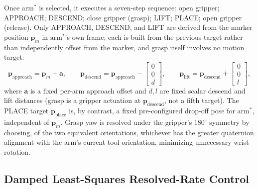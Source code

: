 Once $\text{arm}^*$ is selected, it executes a seven-step sequence: open gripper; APPROACH;
DESCEND; close gripper (grasp); LIFT; PLACE; open gripper (release). Only APPROACH, DESCEND, and
LIFT are derived from the marker position $\mathbf{p}_m$ in $\text{arm}^*$'s own frame; each is
built from the previous target rather than independently offset from the marker, and grasp itself
involves no motion target:
\begin{equation}
\mathbf{p}_{\text{approach}} = \mathbf{p}_m + \mathbf{a}, \qquad
\mathbf{p}_{\text{descend}} = \mathbf{p}_{\text{approach}} - \begin{bmatrix} 0 \\ 0 \\ d \end{bmatrix}, \qquad
\mathbf{p}_{\text{lift}} = \mathbf{p}_{\text{descend}} + \begin{bmatrix} 0 \\ 0 \\ l \end{bmatrix},
\label{eq:sv_waypoints}
\end{equation}
where $\mathbf{a}$ is a fixed per-arm approach offset and $d, l$ are fixed scalar descend and lift
distances (grasp is a gripper actuation at $\mathbf{p}_{\text{descend}}$, not a fifth target). The
PLACE target $\mathbf{p}_{\text{place}}$ is, by contrast, a fixed pre-configured drop-off pose for
$\text{arm}^*$, independent of $\mathbf{p}_m$. Grasp yaw is resolved under the gripper's
$180^\circ$ symmetry by choosing, of the two equivalent orientations, whichever has the greater
quaternion alignment with the arm's current tool orientation, minimizing unnecessary wrist rotation.

\subsection{Damped Least-Squares Resolved-Rate Control}\label{subsec:sv_dls}

